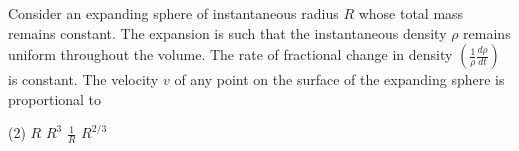 
    \item Consider an expanding sphere of instantaneous radius \( R \) whose total mass remains constant. The expansion is such that the instantaneous density \( \rho \) remains uniform throughout the volume. The rate of fractional change in density \( \left(\frac{1}{\rho} \frac{d\rho}{dt}\right) \) is constant. The velocity \( v \) of any point on the surface of the expanding sphere is proportional to
        \begin{tasks}(2)
            \task \( R \)
            \task \( R^3 \)
            \task \( \frac{1}{R} \)
            \task \( R^{2/3} \)
        \end{tasks}
